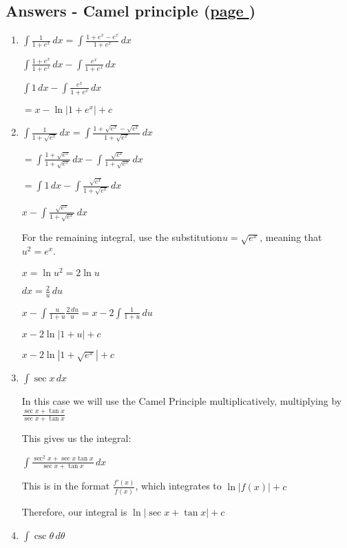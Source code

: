 \documentclass[../main.tex]{subfiles}
\begin{document}
\hypertarget{camelprincipleanswers}{\subsection*{Answers - Camel principle (\hyperlink{camelprinciplelink}{page \pageref{Camel Principle}})}}

\label{Camel principle answers}
\begin{enumerate}
    \item 
    \(\int \frac{1}{1+e^x}\,dx=\int \frac{1+e^x-e^x}{1+e^x}\,dx\)
    
    \(\int \frac{1+e^x}{1+e^x}\,dx-\int \frac{e^x}{1+e^x}\,dx\)

    \(\int 1\,dx-\int \frac{e^x}{1+e^x}\,dx\)

    \(=x-\ln{|1+e^x|}+c\)
    
    \item 
    \(\int \frac{1}{1+\sqrt{e^x}}\,dx=\int \frac{1+\sqrt{e^x}-\sqrt{e^x}}{1+\sqrt{e^x}}\,dx\)

    \(=\int \frac{1+\sqrt{e^x}}{1+\sqrt{e^x}}\,dx-\int \frac{\sqrt{e^x}}{1+\sqrt{e^x}}\,dx\)

    \(=\int 1\,dx-\int \frac{\sqrt{e^x}}{1+\sqrt{e^x}}\,dx\)

    \(x-\int \frac{\sqrt{e^x}}{1+\sqrt{e^x}}\,dx\)

    For the remaining integral, use the substitution\(u=\sqrt{e^x}\), meaning that \(u^2=e^x\).

    \(x=\ln{u^2}=2\ln{u}\)

    \(dx=\frac{2}{u}\,du\)

    \(x-\int \frac{u}{1+u}\frac{2\,du}{u}=x-2\int \frac{1}{1+u}\,du\)

    \(x-2\ln{|1+u|}+c\)

    \(x-2\ln{|1+\sqrt{e^x}|}+c\)
    
    \item 
    \(\int \sec{x}\,dx\)

    In this case we will use the Camel Principle multiplicatively, multiplying by \(\frac{\sec{x}+\tan{x}}{\sec{x}+\tan{x}}\)

    This gives us the integral:

    \(\int \frac{\sec^2{x}+\sec{x}\tan{x}}{\sec{x}+\tan{x}}\,dx\)

    This is in the format \(\frac{f'(x)}{f(x)}\), which integrates to \(\ln{|f(x)|}+c\)

    Therefore, our integral is \(\ln{|\sec{x}+\tan{x}|}+c\)

    \item 
    \(\int \csc{\theta}\,d\theta\)


\end{enumerate}
\end{document}
